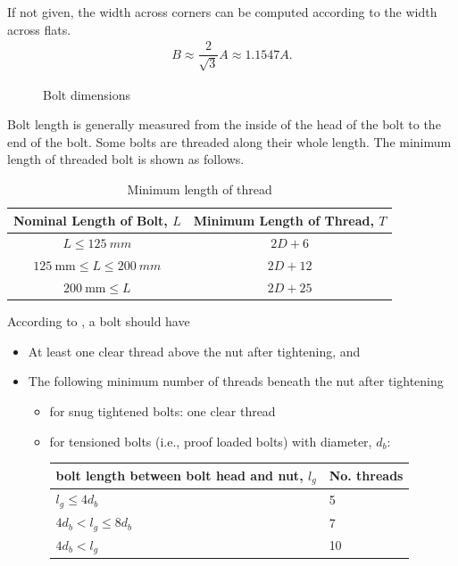 If not given, the width across corners can be computed according to the width across flats.
\begin{gather}
B\approx\dfrac{2}{\sqrt{3}}A\approx1.1547A.
\end{gather}
\begin{figure}[H]
\centering
\caption{Bolt dimensions}
\end{figure}

Bolt length is generally measured from the inside of the head of the bolt to the end of the bolt.
Some bolts are threaded along their whole length.
The minimum length of threaded bolt is shown as follows.
\begin{table}[H]
\centering\footnotesize\caption{Minimum length of thread}
\begin{tabular}{cc}
	\toprule
	          Nominal Length of Bolt, $L$            & Minimum Length of Thread, $T$ \\ \midrule
	            $L\leqslant\SI{125}{mm}$             &            $2D+6$             \\
	$\SI{125}{\mm}\leqslant{}L\leqslant\SI{200}{mm}$ &            $2D+12$            \\
	          $\SI{200}{\mm}\leqslant{}L$            &            $2D+25$            \\ \bottomrule
\end{tabular}
\end{table}

According to , a bolt should have
\begin{itemize}
\item At least one clear thread above the nut after tightening, and
\item The following minimum number of threads beneath the nut after tightening
\begin{itemize}
\item for snug tightened bolts: one clear thread
\item for tensioned bolts (i.e., proof loaded bolts) with diameter, $d_b$:
\begin{center}
\begin{tabular}{ll}
    \toprule
    bolt length between bolt head and nut, $l_g$ & No. threads \\ \midrule
    $l_g\leqslant4d_b$                           & 5           \\
    $4d_b<l_g\leqslant8d_b$                      & 7           \\
    $4d_b<l_g$                                   & 10          \\ \bottomrule
\end{tabular}
\end{center}
\end{itemize}
\end{itemize}

